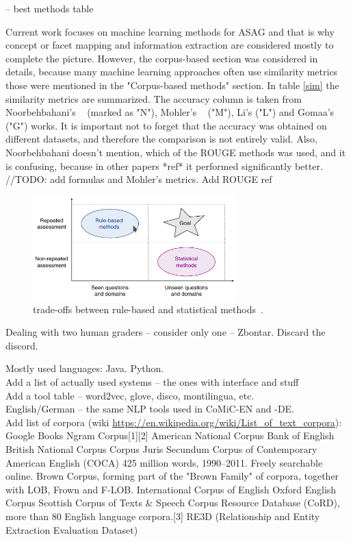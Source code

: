 -- best methods table

Current work focuses on machine learning methods for ASAG and that is why concept or facet mapping and information extraction are considered mostly to complete the picture. However, the corpus-based section was considered in details, because many machine learning approaches often use similarity metrics those were mentioned in the "Corpus-based methods" section. In table \ref{sim} the similarity metrics are summarized. The accuracy column is taken from Noorbehbahani's ~\cite{Noorbehbahani} (marked as "N"), Mohler's ~\cite{Mohler} ("M"), Li's ("L") and Gomaa's ("G") works. It is important not to forget that the accuracy was obtained on different datasets, and therefore the comparison is not entirely valid. Also, Noorbehbahani doesn't mention, which of the ROUGE methods was used, and it is confusing, because in other papers *ref* it performed significantly better. //TODO: add formulas and  Mohler's metrics. Add ROUGE ref\\

\begin{figure}[h!]
  \centering
  \includegraphics[width=0.7\textwidth]{img/ruleVSstat}
    \caption{  trade-offs between rule-based and statistical methods~\cite{Burrows}. }\label{fig:rVSs}
\end{figure}

Dealing with two human graders -- consider only one -- Zbontar. Discard the discord.

Mostly used languages: Java. Python.\\

Add a list of actually used systems -- the ones with interface and stuff\\

Add a tool table -- word2vec, glove, disco, montilingua, etc.\\

English/German -- the same NLP tools used in CoMiC-EN and -DE. \\

Add list of corpora (wiki \url{https://en.wikipedia.org/wiki/List_of_text_corpora}):
Google Books Ngram Corpus[1][2]
American National Corpus
Bank of English
British National Corpus
Corpus Juris Secundum
Corpus of Contemporary American English (COCA) 425 million words, 1990–2011. Freely searchable online.
Brown Corpus, forming part of the "Brown Family" of corpora, together with LOB, Frown and F-LOB.
International Corpus of English
Oxford English Corpus
Scottish Corpus of Texts \& Speech
Corpus Resource Database (CoRD), more than 80 English language corpora.[3]
RE3D (Relationship and Entity Extraction Evaluation Dataset)

